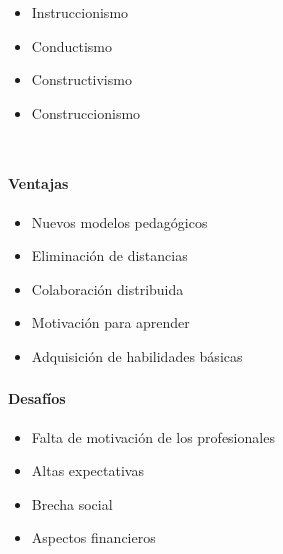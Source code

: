\begin{frame}
\begin{columns}
 \hspace{0.5cm}
\begin{itemize}[<+->]
	\item Instruccionismo
	\item Conductismo
	\item Constructivismo
	\item Construccionismo
\end{itemize}
\end{columns}


\end{frame}

\begin{frame}
    \frametitle{\pagetitle}
    \framesubtitle{Ventajas}
    \begin{itemize}[<+->]
        \item Nuevos modelos pedagógicos
        \item Eliminación de distancias
        \item Colaboración distribuida
        \item Motivación para aprender
        \item Adquisición de habilidades básicas
    \end{itemize}
\end{frame}

\begin{frame}
    \frametitle{\pagetitle}
    \framesubtitle{Desafíos}
	 \begin{itemize}[<+->]
        \item Falta de motivación de los profesionales
        \item Altas expectativas
        \item Brecha social
        \item Aspectos financieros
    \end{itemize}
\end{frame}
